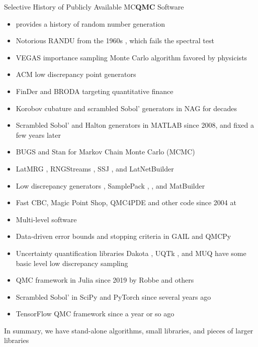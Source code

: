 \documentclass[11pt,compress,xcolor={usenames,dvipsnames},aspectratio=169]{beamer}
\begin{document}
\begin{frame}[allowframebreaks]{Selective History of Publicly Available MC\textbf{QMC} Software}
\vspace{-2ex}
	\begin{itemize}
		\item \textcite{LEc2017a} provides a history of \alert{random number generation}
		\item Notorious \alert{RANDU} from the 1960s \parencite{RANDU}, which fails the spectral test
		\item \alert{VEGAS} \parencite{Lep78a, Lep21a} importance sampling Monte Carlo algorithm favored by physicists
		\item \alert{ACM} low discrepancy point generators \parencite{BraFox88,BraFoxNie92,HonHic00a}
		\item \alert{FinDer} \parencite{PasTra95,FinDer} and \alert{BRODA} \parencite{BRODA20a} targeting quantitative finance
		\item Korobov cubature and scrambled Sobol' generators in \alert{NAG} \parencite{NAG27} for decades		
		\item Scrambled Sobol' and Halton generators in \alert{MATLAB} \parencite{MAT9.13} since 2008, and fixed a few years later
		\item \alert{BUGS} \parencite{BUGSBook, BUGSweb} and \alert{Stan} \parencite{STAN} for Markov Chain Monte Carlo (MCMC)
		\item \alert{LatMRG} \parencite{LEcCou97}, \alert{RNGStreams} \parencite{LEcEtal02},  \alert{SSJ} \parencite{LEc2002a,SSJ}, and \alert{LatNetBuilder} \parencite{LatNet}
		\item Low discrepancy generators \parencite{FriKel02,FriKelweb}, \alert{SamplePack} \parencite{SamplePack}, \textcite{GruWeb},  and \alert{MatBuilder} \parencite{paulin2022}
		\item \alert{Fast CBC}, \alert{Magic Point Shop}, \alert{QMC4PDE} and other code since 2004  at \textcite{NuyWeb}
		\item Multi-level software \parencite{GilesSoft,GilesQSoft} 
		\item Data-driven error bounds and stopping criteria in \alert{GAIL} \parencite{ChoEtal21a} and \alert{QMCPy} \parencite{QMCPy2020a, ChoEtal22a} 
		\item Uncertainty quantification libraries \alert{Dakota} \parencite{DakotaUsersManual}, \alert{UQTk} \parencite{DebEtal04,UQTk}, and \alert{MUQ} \parencite{MUQ} have some basic level low discrepancy sampling
	    \item QMC framework in Julia since 2019 \parencite{QMCJulia} by Robbe and others
		\item Scrambled Sobol' in \alert{SciPy} \parencite{virtanen2020scipy} and \alert{PyTorch} \parencite{paszke2019pytorch} since several years ago
		\item \alert{TensorFlow} QMC framework \parencite{tfqfQMC2021a} since a year or so ago
	\end{itemize}

In summary, we have stand-alone algorithms, small libraries, and pieces of larger libraries
\end{frame}
\end{document}

